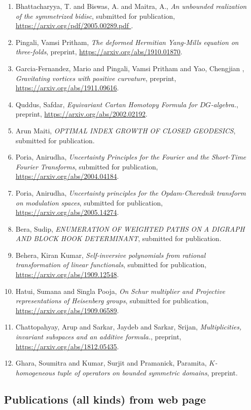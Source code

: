 \begin{enumerate}
\item Bhattacharyya, T. and  Biswas, A. and Maitra, A., \emph{An unbounded realization of the symmetrized bidisc}, submitted for publication, \url{https://arxiv.org/pdf/2005.00289.pdf }.
\item Pingali, Vamsi Pritham, \emph{The deformed Hermitian Yang-Mills equation on three-folds}, preprint, \url{https://arxiv.org/abs/1910.01870}.
\item Garcia-Fernandez, Mario and Pingali, Vamsi Pritham and Yao, Chengjian , \emph{Gravitating vortices with positive curvature}, preprint, \url{https://arxiv.org/abs/1911.09616}.
\item Quddus, Safdar, \emph{Equivariant Cartan Homotopy Formula for $DG$-algebra.}, preprint, \url{https://arxiv.org/abs/2002.02192}.
\item Arun Maiti, \emph{OPTIMAL INDEX GROWTH OF CLOSED GEODESICS}, submitted for publication.
\item  Poria, Anirudha, \emph{Uncertainty Principles for the Fourier and the Short-Time Fourier Transforms}, submitted for publication, \url{https://arxiv.org/abs/2004.04184}.
\item Poria, Anirudha, \emph{Uncertainty principles for the Opdam-Cherednik transform on modulation spaces}, submitted for publication, \url{https://arxiv.org/abs/2005.14274}.
\item Bera, Sudip, \emph{ENUMERATION OF WEIGHTED PATHS ON A DIGRAPH AND BLOCK HOOK DETERMINANT}, submitted for publication.
\item Behera, Kiran Kumar, \emph{Self-inversive polynomials from rational transformation of linear functionals}, submitted for publication, \url{https://arxiv.org/abs/1909.12548}.
\item Hatui, Sumana and Singla Pooja, \emph{On Schur multiplier and Projective representations of Heisenberg groups}, submitted for publication, \url{https://arxiv.org/abs/1909.06589}.
\item Chattopahyay, Arup and Sarkar, Jaydeb and Sarkar, Srijan, \emph{Multiplicities, invariant subspaces and an additive formula.}, preprint, \url{https://arxiv.org/abs/1812.05435}.
\item Ghara, Soumitra and Kumar, Surjit and Pramanick, Paramita, \emph{$K$-homogeneous tuple of operators on bounded symmetric domains}, preprint.
\end{enumerate}


\subsection{Publications (all kinds) from web page}

